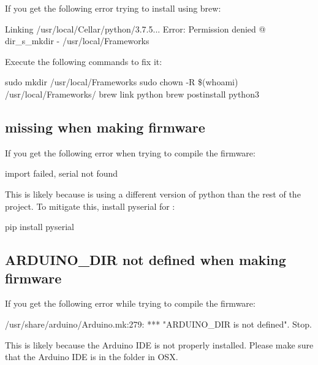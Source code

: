 \noindent If you get the following error trying to install
 using brew:

\begin{snippet}
Linking /usr/local/Cellar/python/3.7.5... Error: Permission denied @ dir_s_mkdir
- /usr/local/Frameworks
\end{snippet}

\noindent Execute the following commands to fix it:

\begin{snippet}
sudo mkdir /usr/local/Frameworks
sudo chown -R \$(whoami) /usr/local/Frameworks/
brew link python
brew postinstall python3
\end{snippet}

\subsection{ missing when making firmware}


\noindent If you get the following error when trying to compile the firmware:

\begin{snippet}
  import failed, serial not found
\end{snippet}

\noindent This is likely because  is using a different version of python than the rest of the project. To mitigate this, install pyserial for :

\begin{snippet}
pip install pyserial
\end{snippet}


\subsection{ARDUINO\_DIR not defined when making firmware}

\noindent If you get the following error while trying to compile the firmware:

\begin{snippet}
/usr/share/arduino/Arduino.mk:279: *** "ARDUINO_DIR is not defined". Stop.
\end{snippet}

\noindent This is likely because the Arduino IDE is not properly installed. Please make
sure that the Arduino IDE is in the  folder in OSX. 

